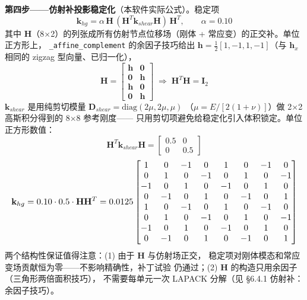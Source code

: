 \documentclass[12pt,a4paper]{ctexart}
\newcommand{\fem}{\Verb}
\begin{document}
\textbf{第四步——仿射补投影稳定化}（本软件实际公式）。稳定项
\begin{equation}
\mathbf{k}_{hg} = \alpha\,\mathbf{H}\,
(\mathbf{H}^T \mathbf{k}_{shear} \mathbf{H})\, \mathbf{H}^T,
\qquad \alpha = 0.10
\end{equation}
其中 $\mathbf{H}$（8$\times$2）的列张成所有仿射节点位移场（刚体 +
常应变）的正交补。单位正方形上，
\fem|_affine_complement| 的余因子技巧给出
$\mathbf{h} = \tfrac{1}{2}[1,-1,1,-1]$（与 $\mathbf{h}_x$ 相同的
zigzag 型向量、已归一化），
\begin{equation}
\mathbf{H} = \begin{bmatrix} \mathbf{h} & \mathbf{0} \\ \mathbf{0} & \mathbf{h} \\ \mathbf{h} & \mathbf{0} \\ \mathbf{0} & \mathbf{h} \end{bmatrix}
\;\Longrightarrow\;
\mathbf{H}^T\mathbf{H} = \mathbf{I}_2
\end{equation}
$\mathbf{k}_{shear}$ 是用纯剪切模量 $\mathbf{D}_{shear} = \mathrm{diag}(2\mu, 2\mu, \mu)$
（$\mu = E/[2(1+\nu)]$）做 2$\times$2 高斯积分得到的 8$\times$8 参考刚度——
只用剪切项避免给稳定化引入体积锁定。单位正方形数值：
\begin{equation}
\mathbf{H}^T \mathbf{k}_{shear} \mathbf{H} = \begin{bmatrix} 0.5 & 0 \\ 0 & 0.5 \end{bmatrix}
\end{equation}
\begin{equation}
\resizebox{\textwidth}{!}{$\displaystyle
\mathbf{k}_{hg} = 0.10 \cdot 0.5 \cdot \mathbf{H}\mathbf{H}^T
= 0.0125 \begin{bmatrix} 1 & 0 & -1 & 0 & 1 & 0 & -1 & 0 \\
0 & 1 & 0 & -1 & 0 & 1 & 0 & -1 \\
-1 & 0 & 1 & 0 & -1 & 0 & 1 & 0 \\
0 & -1 & 0 & 1 & 0 & -1 & 0 & 1 \\
1 & 0 & -1 & 0 & 1 & 0 & -1 & 0 \\
0 & 1 & 0 & -1 & 0 & 1 & 0 & -1 \\
-1 & 0 & 1 & 0 & -1 & 0 & 1 & 0 \\
0 & -1 & 0 & 1 & 0 & -1 & 0 & 1 \end{bmatrix}$}
\end{equation}
两个结构性保证值得注意：(1) 由于 $\mathbf{H}$ 与仿射场正交，
稳定项对刚体模态和常应变场贡献恒为零——不影响精确性，补丁试验
仍通过；(2) $\mathbf{H}$ 的构造只用余因子（三角形两倍面积技巧），
不需要每单元一次 LAPACK 分解（见 §6.4.1 仿射补：余因子技巧）。
\end{document}
